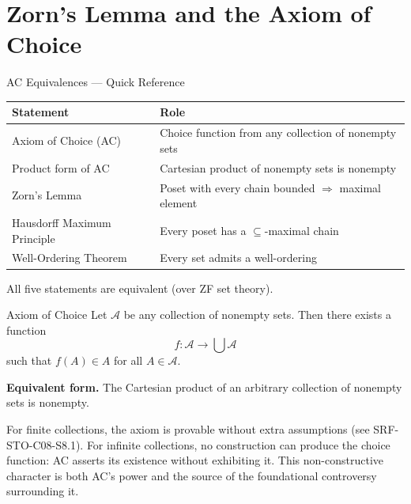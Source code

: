 
\section{Zorn's Lemma and the Axiom of Choice}

\begin{toolkitbox}{AC Equivalences — Quick Reference}
\small
\begin{tabular}{l l}
\toprule
\textbf{Statement} & \textbf{Role} \\
\midrule
Axiom of Choice (AC)         & Choice function from any collection of nonempty sets \\
Product form of AC           & Cartesian product of nonempty sets is nonempty \\
Zorn's Lemma                 & Poset with every chain bounded $\Rightarrow$ maximal element \\
Hausdorff Maximum Principle  & Every poset has a $\subseteq$-maximal chain \\
Well-Ordering Theorem        & Every set admits a well-ordering \\
\bottomrule
\end{tabular}

\medskip
All five statements are equivalent (over ZF set theory).
\end{toolkitbox}


\begin{propositionbox}{Axiom of Choice}
\label{ax:ac}
Let $\mathcal{A}$ be any collection of nonempty sets. Then there exists a
function
\[
  f : \mathcal{A} \to \bigcup \mathcal{A}
\]
such that $f(A) \in A$ for all $A \in \mathcal{A}$.

\medskip
\noindent\textbf{Equivalent form.} The Cartesian product of an arbitrary
collection of nonempty sets is nonempty.
\end{propositionbox}

\begin{remark*}
For finite collections, the axiom is provable without extra assumptions
(see SRF-STO-C08-S8.1). For infinite collections, no construction can
produce the choice function: AC asserts its existence without exhibiting it.
This non-constructive character is both AC's power and the source of the
foundational controversy surrounding it.
\end{remark*}

